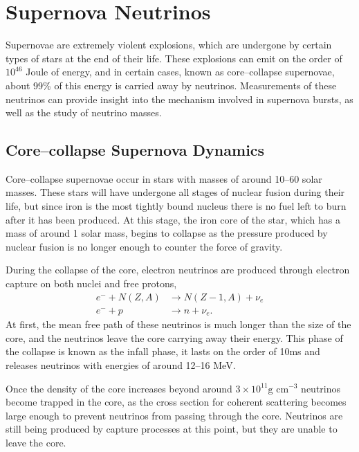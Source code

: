 \section{Supernova Neutrinos} \label{nu_sn}

Supernovae are extremely violent explosions, which are undergone by certain 
types of stars at the end of their life. These explosions can emit on the 
order of $10^{46}$ Joule of energy, and in certain cases, known as 
core--collapse supernovae, about 99\% of this energy is carried away by 
neutrinos.  Measurements of these neutrinos can provide insight into the 
mechanism involved in supernova bursts, as well as the study of neutrino 
masses\cite{GiuntiCarlo2007FoNP}.  

\subsection{Core--collapse Supernova Dynamics}

Core--collapse supernovae occur in stars with masses of around 10--60 solar 
masses. These stars will have undergone all stages of nuclear fusion during
their life, but since iron is the most tightly bound nucleus there is no fuel 
left to burn after it has been produced. At this stage, the iron core of the
star, which has a mass of around 1 solar mass, begins to collapse as the
pressure produced by nuclear fusion is no longer enough to counter the force of
gravity. 

During the collapse of the core, electron neutrinos are produced through
electron capture on both nuclei and free protons,
\begin{align*}
	e^- + N(Z, A) &\rightarrow N(Z - 1, A) + \nu_e \\
	e^- + p &\rightarrow n + \nu_e.
\end{align*}
At first, the mean free path of these neutrinos is much longer than the size of
the core, and the neutrinos leave the core carrying away their energy. This phase
of the collapse is known as the infall phase, it lasts on the order of 10ms and
releases neutrinos with energies of around 12--16 MeV.

Once the density of the core increases beyond around $3\times10^{11} \mbox{g 
cm}^{-3}$ neutrinos become trapped in the core, as the cross section for 
coherent scattering becomes large enough to prevent neutrinos from passing 
through the core. Neutrinos are still being produced by capture processes at 
this point, but they are unable to leave the core.

